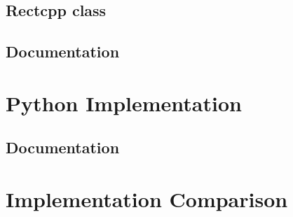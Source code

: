 \subsection{Rectcpp class}
\subsection{Documentation}

\section{Python Implementation}

\subsection{Documentation}

\section{Implementation Comparison}

\filbreak

